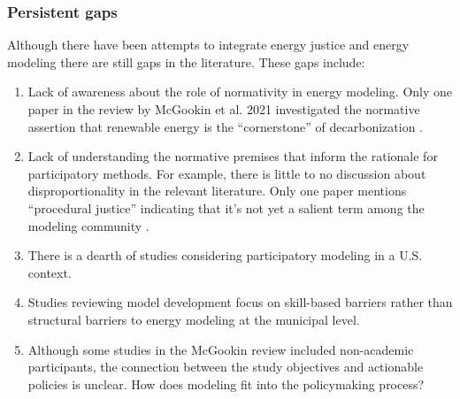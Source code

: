 
\subsubsection{Persistent gaps}
Although there have been attempts to integrate energy justice and energy
modeling there are still gaps in the literature. These gaps include:
\begin{enumerate}
    \item Lack of awareness about the role of normativity in energy modeling.
    Only one paper in the review by McGookin et al. 2021 investigated the
    normative assertion that renewable energy is the ``cornerstone'' of
    decarbonization \cite{zelt_long-term_2019}.
    \item Lack of understanding the normative premises that inform the rationale
    for participatory methods. For example, there is little to no discussion
    about disproportionality in the relevant literature. Only one paper mentions
    ``procedural justice'' indicating that it's not yet a salient term among the
    modeling community \cite{knudsen_local_2015}.
    \item There is a dearth of studies considering participatory modeling in a
    U.S. context.
    \item Studies reviewing model development focus on skill-based barriers
    rather than structural barriers to energy modeling at the municipal level.
    \item Although some studies in the McGookin review
    \cite{mcgookin_participatory_2021} included non-academic participants, the
    connection between the study objectives and actionable policies is unclear.
    How does modeling fit into the policymaking process?
\end{enumerate}

